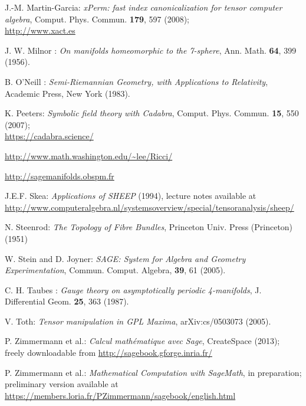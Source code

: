 \begin{thebibliography}{123}
J.-M. Martin-Garcia: {\em xPerm: fast index canonicalization for tensor computer algebra}, Comput. Phys. Commun. {\bf 179}, 597 (2008);\\
\url{http://www.xact.es}

J. W. Milnor : {\em On manifolds homeomorphic to the 7-sphere},
Ann. Math. {\bf 64}, 399 (1956).

B. O'Neill : {\em Semi-Riemannian Geometry, with Applications to Relativity},
Academic Press, New York (1983).

K. Peeters: {\em Symbolic field theory with Cadabra},
Comput. Phys. Commun. {\bf 15}, 550 (2007);\\
\url{https://cadabra.science/}

\url{http://www.math.washington.edu/~lee/Ricci/}

\url{http://sagemanifolds.obspm.fr}

J.E.F. Skea: \emph{Applications of SHEEP} (1994), lecture notes available at
\url{http://www.computeralgebra.nl/systemsoverview/special/tensoranalysis/sheep/}

N. Steenrod: \emph{The Topology of Fibre Bundles}, Princeton Univ. Press (Princeton) (1951)

W. Stein and D. Joyner: {\em SAGE: System for Algebra and Geometry Experimentation},
Commun. Comput. Algebra, {\bf 39}, 61 (2005).

C. H. Taubes : {\em Gauge theory on asymptotically periodic 4-manifolds},
J. Differential Geom. {\bf 25}, 363 (1987).

V. Toth: {\em Tensor manipulation in GPL Maxima},
arXiv:cs/0503073 (2005).

P. Zimmermann et al.: {\it Calcul math\'ematique avec Sage}, CreateSpace (2013);
freely downloadable from \url{http://sagebook.gforge.inria.fr/}

P. Zimmermann et al.: {\it Mathematical Computation with SageMath},
in preparation; preliminary version available at
\url{https://members.loria.fr/PZimmermann/sagebook/english.html}

\end{thebibliography}
